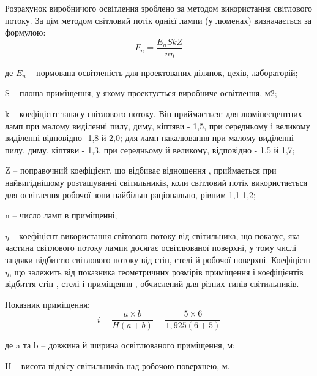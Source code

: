 \documentclass[ukrainian,utf8,simple,floatsubsection, hpadding=5mm,equationsubsection,]{eskdtext}
\begin{document}
Розрахунок виробничого освітлення зроблено за методом використання 
світлового потоку. За цім методом світловий потік однієї лампи (у люменах) визначається за формулою:
\begin{equation}
\label{eq:fnop}
 F_n = \frac{E_{n}SkZ}{n \eta}
\end{equation}
\begin{ESKDexplanation}
\item де $E_n$ -- нормована освітленість для проектованих ділянок, цехів, лабораторій;
\item S – площа приміщення, у якому проектується виробниче освітлення, м2;
\item k – коефіцієнт запасу світлового потоку. Він приймається: для люмінесцентних ламп при малому виділенні пилу, диму, кіптяви - 1,5, при середньому і великому виділенні відповідно -1,8 й 2,0; для ламп накалювання при малому виділенні пилу, диму, кіптяви - 1,3, при середньому й великому, відповідно - 1,5 й 1,7;
\item Z – поправочний коефіцієнт, що відбиває відношення  , приймається при найвигіднішому розташуванні світильників, коли світловий потік використається для освітлення робочої зони найбільш раціонально, рівним 1,1-1,2; 
\item n – число ламп в приміщенні;
\item  $\eta$ – коефіцієнт використання світового потоку від світильника, що показує, яка частина світлового потоку лампи   досягає освітлюваної поверхні, у тому числі завдяки відбиттю світлового потоку від стін, стелі й робочої поверхні.
Коефіцієнт $\eta$, що залежить від показника геометричних розмірів приміщення   і коефіцієнтів відбиття стін  , стелі   і приміщення  , обчислений для різних типів світильників.	  
\end{ESKDexplanation}

Показник  приміщення:
\begin{equation}
\label{eq:iop}
 i = \frac{a \times b}{H(a+b)}= \frac{5 \times 6}{1,925(6+5)}
\end{equation}
\begin{ESKDexplanation}
  \item де a та b – довжина й ширина освітлюваного приміщення, м;  
  \item H – висота підвісу світильників над робочою поверхнею, м.
\end{ESKDexplanation}
\end{document}
